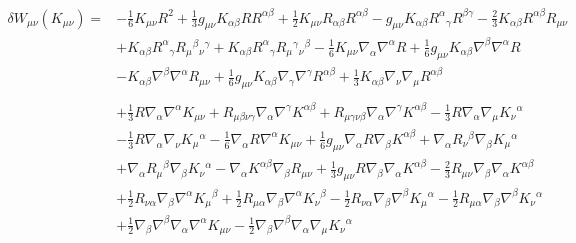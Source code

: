 \documentclass[10pt,letterpaper]{article}
\begin{document}
\begin{align}
\delta W_{\mu\nu}(K_{\mu\nu})={}&- \tfrac{1}{6} K_{\mu \nu} R^2
 + \tfrac{1}{3} g_{\mu \nu} K_{\alpha \beta} R R^{\alpha \beta}
 + \tfrac{1}{2} K_{\mu \nu} R_{\alpha \beta} R^{\alpha \beta}
 -  g_{\mu \nu} K_{\alpha \beta} R^{\alpha}{}_{\gamma} R^{\beta \gamma}
 -  \tfrac{2}{3} K_{\alpha \beta} R^{\alpha \beta} R_{\mu \nu}\nonumber\\
& + K_{\alpha \beta} R^{\alpha}{}_{\gamma} R_{\mu}{}^{\beta}{}_{\nu}{}^{\gamma}
 + K_{\alpha \beta} R^{\alpha}{}_{\gamma} R_{\mu}{}^{\gamma}{}_{\nu}{}^{\beta}
 -  \tfrac{1}{6} K_{\mu \nu} \nabla_{\alpha}\nabla^{\alpha}R
 + \tfrac{1}{6} g_{\mu \nu} K_{\alpha \beta} \nabla^{\beta}\nabla^{\alpha}R\nonumber\\
& -  K_{\alpha \beta} \nabla^{\beta}\nabla^{\alpha}R_{\mu \nu}
 + \tfrac{1}{6} g_{\mu \nu} K_{\alpha \beta} \nabla_{\gamma}\nabla^{\gamma}R^{\alpha \beta}
 + \tfrac{1}{3} K_{\alpha \beta} \nabla_{\nu}\nabla_{\mu}R^{\alpha \beta}\nonumber \\
\nonumber \\
&+\tfrac{1}{3} R \nabla_{\alpha}\nabla^{\alpha}K_{\mu \nu}
 + R_{\mu \beta \nu \gamma} \nabla_{\alpha}\nabla^{\gamma}K^{\alpha \beta}
 + R_{\mu \gamma \nu \beta} \nabla_{\alpha}\nabla^{\gamma}K^{\alpha \beta}
 -  \tfrac{1}{3} R \nabla_{\alpha}\nabla_{\mu}K_{\nu}{}^{\alpha}\nonumber\\
& -  \tfrac{1}{3} R \nabla_{\alpha}\nabla_{\nu}K_{\mu}{}^{\alpha}
 -  \tfrac{1}{6} \nabla_{\alpha}R \nabla^{\alpha}K_{\mu \nu}
 + \tfrac{1}{6} g_{\mu \nu} \nabla_{\alpha}R \nabla_{\beta}K^{\alpha \beta}
 + \nabla_{\alpha}R_{\nu}{}^{\beta} \nabla_{\beta}K_{\mu}{}^{\alpha}\nonumber\\
& + \nabla_{\alpha}R_{\mu}{}^{\beta} \nabla_{\beta}K_{\nu}{}^{\alpha}
 -  \nabla_{\alpha}K^{\alpha \beta} \nabla_{\beta}R_{\mu \nu}
 + \tfrac{1}{3} g_{\mu \nu} R \nabla_{\beta}\nabla_{\alpha}K^{\alpha \beta}
 -  \tfrac{2}{3} R_{\mu \nu} \nabla_{\beta}\nabla_{\alpha}K^{\alpha \beta}\nonumber\\
& + \tfrac{1}{2} R_{\nu \alpha} \nabla_{\beta}\nabla^{\alpha}K_{\mu}{}^{\beta}
 + \tfrac{1}{2} R_{\mu \alpha} \nabla_{\beta}\nabla^{\alpha}K_{\nu}{}^{\beta}
 -  \tfrac{1}{2} R_{\nu \alpha} \nabla_{\beta}\nabla^{\beta}K_{\mu}{}^{\alpha}
 -  \tfrac{1}{2} R_{\mu \alpha} \nabla_{\beta}\nabla^{\beta}K_{\nu}{}^{\alpha}\nonumber\\
& + \tfrac{1}{2} \nabla_{\beta}\nabla^{\beta}\nabla_{\alpha}\nabla^{\alpha}K_{\mu \nu}
 -  \tfrac{1}{2} \nabla_{\beta}\nabla^{\beta}\nabla_{\alpha}\nabla_{\mu}K_{\nu}{}^{\alpha}

\end{align}
\end{document}
